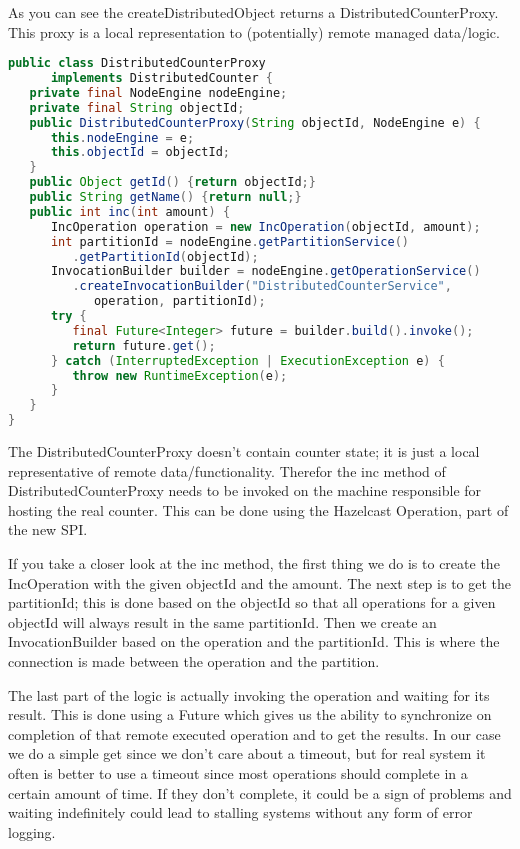 As you can see the createDistributedObject returns a DistributedCounterProxy. This proxy is a local representation to (potentially) remote managed data/logic.  
\begin{lstlisting}[language=java]
public class DistributedCounterProxy 
      implements DistributedCounter {
   private final NodeEngine nodeEngine;
   private final String objectId;
   public DistributedCounterProxy(String objectId, NodeEngine e) {
      this.nodeEngine = e;
      this.objectId = objectId;
   }
   public Object getId() {return objectId;}
   public String getName() {return null;}
   public int inc(int amount) {
      IncOperation operation = new IncOperation(objectId, amount);   
      int partitionId = nodeEngine.getPartitionService()
         .getPartitionId(objectId);
      InvocationBuilder builder = nodeEngine.getOperationService()
         .createInvocationBuilder("DistributedCounterService", 
            operation, partitionId);
      try {
         final Future<Integer> future = builder.build().invoke();
         return future.get();
      } catch (InterruptedException | ExecutionException e) {
         throw new RuntimeException(e);
      }
   }
}
\end{lstlisting}
The DistributedCounterProxy doesn't contain counter state; it is just a local representative of remote data/functionality. Therefor the inc method of DistributedCounterProxy needs to be invoked on the machine responsible for hosting the real counter. This can be done using the Hazelcast Operation, part of the new SPI. 

If you take a closer look at the inc method, the first thing we do is to create the IncOperation with the given objectId and the amount. The next step is to get the partitionId; this is done based on the objectId so that all operations for a given objectId will always result in the same partitionId. Then we create an InvocationBuilder based on the operation and the partitionId. This is where the connection is made between the operation and the partition. 

The last part of the logic is actually invoking the operation and waiting for its result. This is done using a Future which gives us the ability to synchronize on completion of that remote executed operation and to get the results. In our case we do a simple get since we don't care about a timeout, but for real system it often is better to use a timeout since most operations should complete in a certain amount of time. If they don't complete, it could be a sign of problems and waiting indefinitely could lead to stalling systems without any form of error logging.

